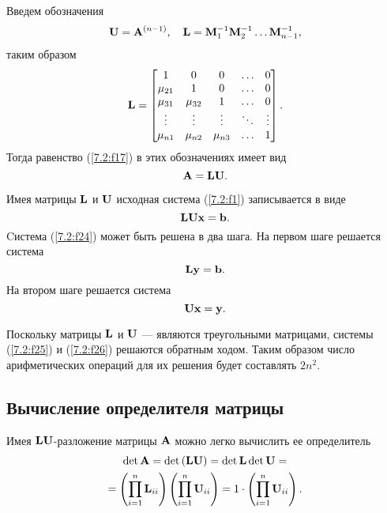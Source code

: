 \documentclass[12pt]{article}
\begin{document}
    Введем обозначения
    \begin{equation}
        \bold{U}=\bold{A}^{\left(n-1\right)},\quad\bold{L}=\bold{M}_1^{-1}\bold{M}_2^{-1}\ldots\bold{M}_{n-1}^{-1},
    \end{equation}
    таким образом
    \begin{equation}
        \bold{L}=\begin{bmatrix}
                1 & 0 & 0 & \ldots & 0 \\
                \mu_{21} & 1 & 0 & \ldots & 0 \\
                \mu_{31} & \mu_{32} & 1 & \ldots & 0 \\
                 \vdots & \vdots & \vdots & \ddots & \vdots \\
                 \mu_{n1} & \mu_{n2} & \mu_{n3} & \ldots & 1
            \end{bmatrix}.
    \end{equation}
    Тогда равенство (\ref{7.2:f17}) в этих обозначениях имеет вид
    \begin{equation}
        \bold{A}=\bold{LU}.
        \label{7.2:f23}
    \end{equation}

    Имея матрицы $\bold{L}$ и $\bold{U}$ исходная система (\ref{7.2:f1}) записывается в виде
    \begin{equation}
        \bold{LU}\bold{x}=\bold{b}.
        \label{7.2:f24}
    \end{equation}
    Cистема (\ref{7.2:f24}) может быть решена в два шага. На первом шаге решается система
    \begin{equation}
        \bold{Ly=b}.
        \label{7.2:f25}
    \end{equation}
    На втором шаге решается система
    \begin{equation}
        \bold{Ux=y}.
        \label{7.2:f26}
    \end{equation}

    
    Поскольку матрицы $\bold{L}$ и $\bold{U}$ --- являются треугольными матрицами, системы (\ref{7.2:f25}) и (\ref{7.2:f26}) решаются обратным ходом. Таким образом число арифметических операций для их решения будет составлять $2n^2$. 

    \subsection*{Вычисление определителя матрицы}
    Имея $\bold{LU}$-разложение матрицы $\bold{A}$ можно легко вычислить ее определитель
    \begin{equation}
        \begin{gathered}
            \det \bold{A}=\det \bold{\left(LU\right)} = \det \bold{L}\det \bold{U}=\\=\left(\prod_{i=1}^{n}\bold{L}_{ii}\right)\left(\prod_{i=1}^{n}\bold{U}_{ii}\right)=1\cdot \left(\prod_{i=1}^{n}\bold{U}_{ii}\right).
        \end{gathered}
    \end{equation}
    
\end{document}
